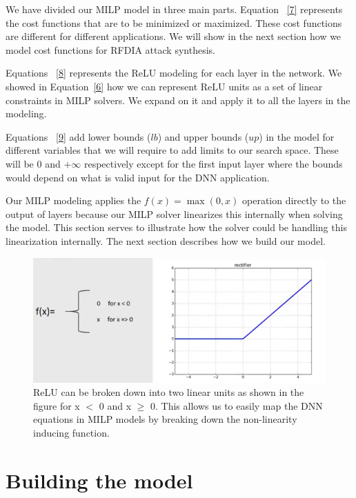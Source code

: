 We have divided our \ac{MILP} model in three main parts. 
Equation ~\ref{7} represents the cost functions that are to be minimized or maximized.
These cost functions are different for different applications.  
We will show in the next section how we model cost functions for \ac{RFDIA}
attack synthesis. 

Equations ~\ref{8} represents the ReLU modeling for each layer in the network. 
We showed in Equation~\ref{6} how we can represent ReLU units as a set of linear constraints in \ac{MILP} solvers. 
We expand on it and apply it to all the layers in the modeling. 

Equations ~\ref{9} add lower bounds ($lb$) and upper bounds ($up$) in the  model for different variables that we will  require to add limits to our search space.  
These will be 0 and $+\infty$ respectively except for the first input layer
where the bounds would depend on what is valid input for the DNN application.

Our MILP modeling applies the $f(x) = \max(0, x)$ operation directly to the output of layers because our MILP solver linearizes this internally when solving the model.
This section serves to illustrate how the solver could be handling this linearization internally. The next section describes how we build our model.




\begin{figure}
	\centering
	\includegraphics[width=0.7\linewidth]{Images/ReLUbreakdown}
	\caption{ReLU can be broken down into two linear units as shown in the figure for x $<$ 0 and x $\geq$ 0. This allows us to easily map the DNN equations in MILP models by breaking down the non-linearity inducing function.}
	\label{fig:relubreakdown}
\end{figure}

\section{Building the model}
\label{section:attacks}

